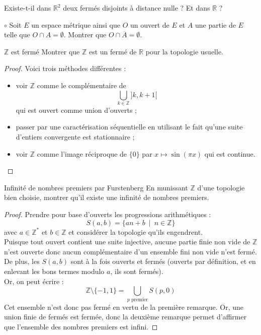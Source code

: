 \documentclass[french,a4paper]{article}
\newcommand{\Z}{\mathbb{Z}}
\newcommand{\R}{\mathbb{R}}
\newcommand{\st}{^*}
\theoremstyle{plain}
\theoremstyle{definition}
\theoremstyle{remark}
\begin{document}
\begin{ex}{}
	Existe-t-il dans $\R^2$ deux fermés disjoints à distance nulle ? Et dans $\R$ ?
\end{ex}

\begin{ex}{$\circ$}
	Soit $E$ un espace métrique ainsi que $O$ un ouvert de $E$ et $A$ une partie de $E$ telle que $O\cap A=\emptyset$. Montrer que $O\cap\overline{A}=\emptyset$.
\end{ex}

\begin{ex}{$\Z$ est fermé}
	Montrer que $\Z$ est un fermé de $\R$ pour la topologie usuelle.
\end{ex}
\begin{proof}
	Voici trois méthodes différentes :
	\begin{itemize}
		\item voir $\Z$ comme le complémentaire de $$\bigcup_{k\in\Z}]k,k+1[$$ qui est ouvert comme union d'ouverts ;
		\item passer par une caractérisation séquentielle en utilisant le fait qu'une suite d'entiers convergente est stationnaire ;
		\item voir $\Z$ comme l'image réciproque de $\{0\}$ par $x\mapsto\sin(\pi x)$ qui est continue.
	\end{itemize}
\end{proof}

\begin{ex}[Guindy]{Infinité de nombres premiers par Furstenberg}
	En munissant $\Z$ d'une topologie bien choisie, montrer qu'il existe une infinité de nombres premiers.
\end{ex}
\begin{proof}
	Prendre pour base d'ouverts les progressions arithmétiques : $$S(a,b)=\{an+b\ \mid\ n\in\Z\}$$ avec $a\in\Z\st$ et $b\in\Z$ et considérer la topologie qu'ils engendrent. \\ Puisque tout ouvert contient une suite injective, aucune partie finie non vide de $\Z$ n'est ouverte donc aucun complémentaire d'un ensemble fini non vide n'est fermé. De plus, les $S(a,b)$ sont à la fois ouverts et fermés (ouverts par définition, et en enlevant les bons termes modulo $a$, ils sont fermés). \\ Or, on peut écrire : $$\Z\setminus\{-1,1\}=\bigcup_{p\text{ premier}}S(p,0)$$ Cet ensemble n'est donc pas fermé en vertu de la première remarque. Or, une union finie de fermés est fermée, donc la deuxième remarque permet d'affirmer que l'ensemble des nombres premiers est infini.
\end{proof}
\end{document}
